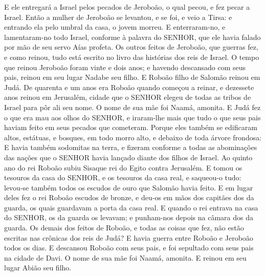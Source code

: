 {{{{{{  E ele entregará a Israel pelos pecados de Jeroboão, o qual pecou, e fez pecar a Israel}}}}}.
  Então a mulher de Jeroboão se levantou, e se foi, e veio a Tirsa: e entrando ela pelo umbral da casa, o jovem morreu.
  E enterraram-no, e lamentaram-no todo Israel, conforme à palavra do SENHOR, que ele havia falado por mão de seu servo Aías profeta.
  Os outros feitos de Jeroboão, que guerras fez, e como reinou, tudo está escrito no livro das histórias dos reis de Israel.
  O tempo que reinou Jeroboão foram vinte e dois anos; e havendo descansado com seus pais, reinou em seu lugar Nadabe seu filho.
  E Roboão filho de Salomão reinou em Judá. De quarenta e um anos era Roboão quando começou a reinar, e dezessete anos reinou em Jerusalém, cidade que o SENHOR elegeu de todas as tribos de Israel para pôr ali seu nome. O nome de sua mãe foi Naamá, amonita.
  E Judá fez o que era mau aos olhos do SENHOR, e iraram-lhe mais que tudo o que seus pais haviam feito em seus pecados que cometeram.
  Porque eles também se edificaram altos, estátuas, e bosques, em todo morro alto, e debaixo de toda árvore frondosa:
  E havia também sodomitas na terra, e fizeram conforme a todas as abominações das nações que o SENHOR havia lançado diante dos filhos de Israel.
  Ao quinto ano do rei Roboão subiu Sisaque rei do Egito contra Jerusalém.
  E tomou os tesouros da casa do SENHOR, e os tesouros da casa real, e saqueou-o tudo: levou-se também todos os escudos de ouro que Salomão havia feito.
  E em lugar deles fez o rei Roboão escudos de bronze, e deu-os em mãos dos capitães dos da guarda, os quais guardavam a porta da casa real.
  E quando o rei entrava na casa do SENHOR, os da guarda os levavam; e punham-nos depois na câmara dos da guarda.
  Os demais dos feitos de Roboão, e todas as coisas que fez, não estão escritas nas crônicas dos reis de Judá?
  E havia guerra entre Roboão e Jeroboão todos os dias.
  E descansou Roboão com seus pais, e foi sepultado com seus pais na cidade de Davi. O nome de sua mãe foi Naamá, amonita. E reinou em seu lugar Abião seu filho.
\par }

